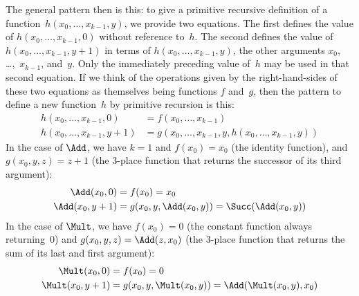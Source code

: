 \documentclass[../../../include/open-logic-section]{subfiles}
\begin{document}
The general pattern then is this: to give a primitive recursive
definition of a function~$h(x_0, \dots, x_{k-1}, y)$, we provide two
equations. The first defines the value of $h(x_0, \dots, x_{k-1}, 0)$
without reference to~$h$. The second defines the value of $h(x_0,
\dots, x_{k-1}, y+1)$ in terms of $h(x_0, \dots, x_{k-1}, y)$, the other
arguments $x_0$, \dots,~$x_{k-1}$, and~$y$. Only the immediately preceding
value of~$h$ may be used in that second equation.  If we think of the
operations given by the right-hand-sides of these two equations as
themselves being functions $f$ and~$g$, then the pattern to define a
new function~$h$ by primitive recursion is this:
\begin{align*}
  h(x_0, \dots, x_{k-1}, 0) & = f(x_0, \dots, x_{k-1})\\
  h(x_0, \dots, x_{k-1}, y+1) & =
  g(x_0, \dots, x_{k-1}, y, h(x_0, \dots, x_{k-1}, y))
\end{align*}  
In the case of $\Add$, we have $k=1$ and $f(x_0) = x_0$ (the
identity function), and $g(x_0, y, z) = z + 1$ (the $3$-place function
that returns the successor of its third argument):
\begin{align*}
  \Add(x_0, 0) & = f(x_0) = x_0\\
  \Add(x_0, y+1) & = g(x_0, y, \Add(x_0, y)) =
  \Succ(\Add(x_0, y))
\end{align*}
In the case of $\Mult$, we have $f(x_0) = 0$ (the constant
function always returning~$0$) and $g(x_0, y, z) = \Add(z,x_0)$
(the $3$-place function that returns the sum of its last and first
argument):
\begin{align*}
  \Mult(x_0,0) & =  f(x_0) = 0 \\
  \Mult(x_0,y+1) & =  g(x_0, y, \Mult(x_0,y)) =
  \Add(\Mult(x_0,y), x_0)
\end{align*}
\end{document}

